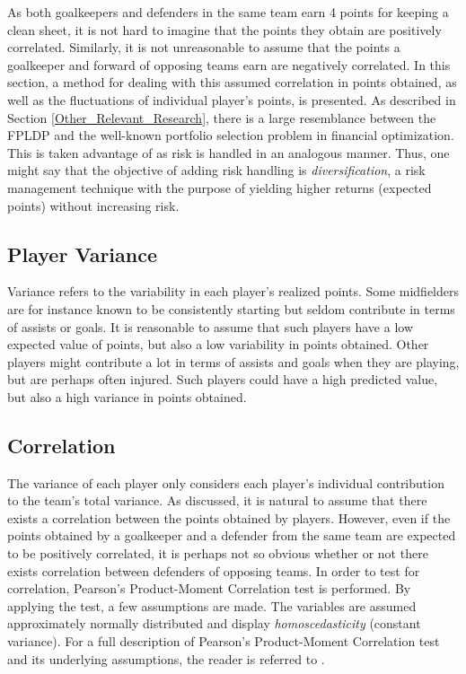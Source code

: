 As both goalkeepers and defenders in the same team earn 4 points for keeping a clean sheet, it is not hard to imagine that the points they obtain are positively correlated. Similarly, it is not unreasonable to assume that the points a goalkeeper and forward of opposing teams earn are negatively correlated. In this section, a method for dealing with this assumed correlation in points obtained, as well as the fluctuations of individual player's points, is presented. As described in Section \ref{Other_Relevant_Research}, there is a large resemblance between the FPLDP and the well-known portfolio selection problem in financial optimization. This is taken advantage of as risk is handled in an analogous manner. Thus, one might say that the objective of adding risk handling is \textit{diversification}, a risk management technique with the purpose of yielding higher returns (expected points) without increasing risk.



\subsection{Player Variance}

Variance refers to the variability in each player's realized points. Some midfielders are for instance known to be consistently starting but seldom contribute in terms of assists or goals. It is reasonable to assume that such players have a low expected value of points, but also a low variability in points obtained. Other players might contribute a lot in terms of assists and goals when they are playing, but are perhaps often injured. Such players could have a high predicted value, but also a high variance in points obtained.

\subsection{Correlation}

The variance of each player only considers each player's individual contribution to the team's total variance. As discussed, it is natural to assume that there exists a correlation between the points obtained by players. However, even if the points obtained by a goalkeeper and a defender from the same team are expected to be positively correlated, it is perhaps not so obvious whether or not there exists correlation between defenders of opposing teams. In order to test for correlation, Pearson's Product-Moment Correlation test is performed. By applying the test, a few assumptions are made. The variables are assumed approximately normally distributed and display \textit{homoscedasticity} (constant variance). For a full description of Pearson's Product-Moment Correlation test and its underlying assumptions, the reader is referred to \cite{laerd}.

